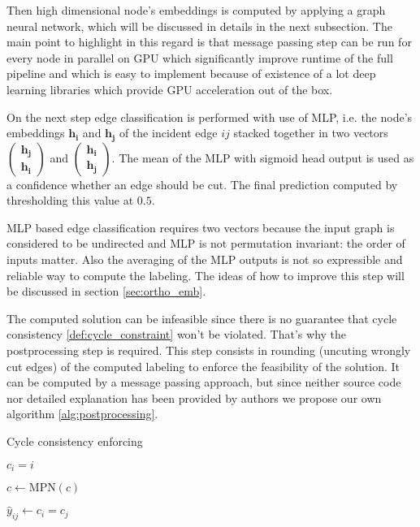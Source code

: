 \documentclass[10pt, twocolumn, a4paper]{article}
\theoremstyle{definition}
\begin{document}
Then high dimensional node's embeddings is computed by applying a graph neural network, which will be
discussed in details in the next subsection. The main point to highlight in this regard is that
message passing step  can be run for every node in parallel on GPU which significantly improve runtime of the
full pipeline and which is easy to implement because of existence of a lot deep learning libraries
which provide GPU acceleration out of the box.

On the next step edge classification is performed with use of MLP, i.e. the node's embeddings $\mathbf{h_i}$ and
$\mathbf{h_j}$ of the incident edge $ij$ stacked together in two vectors
$\left( \substack{\mathbf{h_j} \\ \mathbf{h_i}} \right)$ and
$\left( \substack{\mathbf{h_i} \\ \mathbf{h_j}} \right)$. The mean of the MLP with sigmoid head
output is used as a confidence whether an edge should be cut. The final prediction computed by thresholding
this value at $0.5$.

MLP based edge classification requires two vectors because the input graph is considered to be undirected and
MLP is not permutation invariant: the order of inputs
matter. Also the averaging of the MLP outputs is not so expressible and reliable way to compute the labeling.
The ideas of how to improve this step will be discussed in section \ref{sec:ortho_emb}.

The computed solution can be infeasible since there is no guarantee that cycle consistency \eqref{def:cycle_constraint} won't be
violated. That's why the postprocessing step is required. This step consists in rounding (uncuting wrongly cut edges) of the computed
labeling to enforce the feasibility of the solution. It can be computed by a message passing approach, but since
neither source code nor detailed explanation has been provided by authors we propose our own algorithm \ref{alg:postprocessing}.

\begin{algorithm}[h]
    \caption{Cycle consistency enforcing} \label{alg:postprocessing}

    {
        $c_i = i$ 
    }

    {
        $c \gets \text{MPN}(c)$ 
    }

    {
        $\hat{y}_{ij} \gets c_i = c_j$ \;
    }

\end{algorithm}
\end{document}
